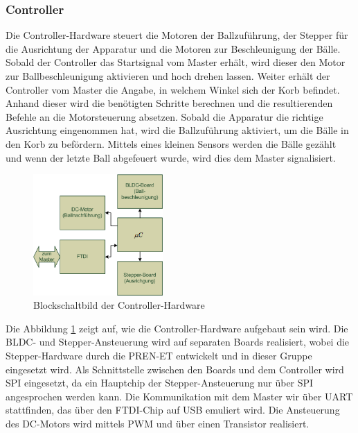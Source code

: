 \subsubsection{Controller}
	Die Controller-Hardware steuert die Motoren der Ballzuführung, der Stepper für die Ausrichtung der Apparatur und die Motoren zur Beschleunigung der Bälle. Sobald der Controller das Startsignal vom Master erhält, wird dieser den Motor zur Ballbeschleunigung aktivieren und hoch drehen lassen. Weiter erhält der Controller vom Master die Angabe, in welchem Winkel sich der Korb befindet. Anhand dieser wird die benötigten Schritte berechnen und die resultierenden Befehle an die Motorsteuerung absetzen. Sobald die Apparatur die richtige Ausrichtung eingenommen hat, wird die Ballzuführung aktiviert, um die Bälle in den Korb zu befördern. Mittels eines kleinen Sensors werden die Bälle gezählt und wenn der letzte Ball abgefeuert wurde, wird dies dem Master signalisiert.\\
	\begin{figure}
		\centering
		\includegraphics[width=0.44\textwidth]{Enddokumentation/Loesungskonzept/Bilder/Blockschaltbild_Controller.png}
		\caption{Blockschaltbild der Controller-Hardware}
		\label{fig:Blockschaltbild_Controller}
	\end{figure}
	Die Abbildung \ref{fig:Blockschaltbild_Controller} zeigt auf, wie die Controller-Hardware aufgebaut sein wird. Die BLDC- und Stepper-Ansteuerung wird auf separaten Boards realisiert, wobei die Stepper-Hardware durch die PREN-ET
	entwickelt und in dieser Gruppe eingesetzt wird. Als Schnittstelle zwischen den Boards und dem Controller wird SPI eingesetzt, da ein Hauptchip der Stepper-Ansteuerung nur über SPI angesprochen werden kann. Die Kommunikation mit dem Master wir über UART stattfinden, das über den FTDI-Chip auf USB emuliert wird. Die Ansteuerung des DC-Motors wird mittels PWM und über einen Transistor realisiert.